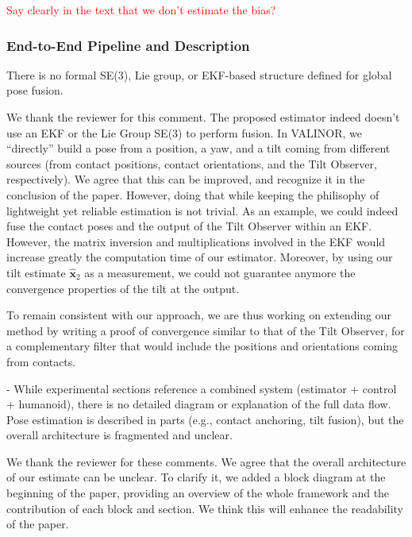 \textcolor{red}{Say clearly in the text that we don't estimate the bias?}

 

\subsubsection{End-to-End Pipeline and Description}




\begin{revquote}
There is no formal SE(3), Lie group, or EKF-based structure defined for global pose fusion.
\end{revquote}

\hypertarget{CommentSe3Fusion}{}
We thank the reviewer for this comment. The proposed estimator indeed doesn't use an EKF or the Lie Group SE(3) to perform fusion. In VALINOR, we ``directly'' build a pose from a position, a yaw, and a tilt coming from different sources (from contact positions, contact orientations, and the Tilt Observer, respectively). We agree that this can be improved, and recognize it in the conclusion of the paper. However, doing that while keeping the philisophy of lightweight yet reliable estimation is not trivial. 
As an example, we could indeed fuse the contact poses and the output of the Tilt Observer within an EKF. However, the matrix inversion and multiplications involved in the EKF would increase greatly the computation time of our estimator. Moreover, by using our tilt estimate $\hat{\boldsymbol{x}}_{2}$ as a measurement, we could not guarantee anymore the convergence properties of the tilt at the output.


To remain consistent with our approach, we are thus working on extending our method by writing a proof of convergence similar to that of the Tilt Observer, for a complementary filter that would include the positions and orientations coming from contacts. 

\begin{revquote}
- While experimental sections reference a combined system (estimator + control + humanoid), there is no detailed diagram or explanation of the full data flow. Pose estimation is described in parts (e.g., contact anchoring, tilt fusion), but the overall architecture is fragmented and unclear.
\end{revquote}


We thank the reviewer for these comments. We agree that the overall architecture of our estimate can be unclear. To clarify it, we added a block diagram \io at the beginning of the paper, providing an overview of the whole framework and the contribution of each block and section. We think this will enhance the readability of the paper.

